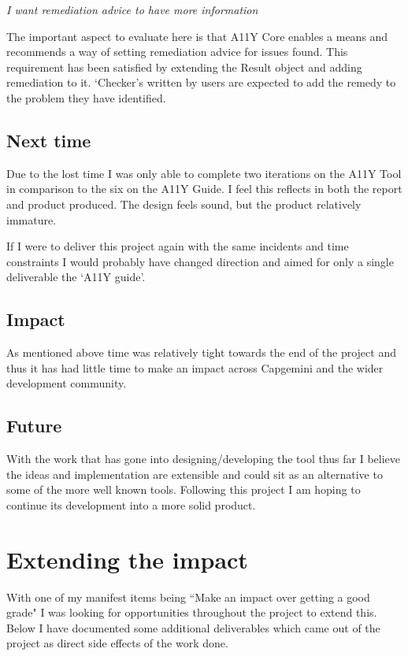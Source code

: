\begin{center}
\textit{I want remediation advice to have more information}
\end{center}
The important aspect to evaluate here is that A11Y Core enables a means and
recommends a way of setting remediation advice for issues found. This
requirement has been satisfied by extending the Result object and adding
remediation to it. `Checker's written by users are expected to add the remedy
to the problem they have identified.

\subsection{Next time}
Due to the lost time I was only able to complete two iterations on the A11Y
Tool in comparison to the six on the A11Y Guide. I feel this reflects in both
the report and product produced. The design feels sound, but the product
relatively immature.

If I were to deliver this project again with the same incidents and time
constraints I would probably have changed direction and aimed for only a
single deliverable the `A11Y guide'.

\subsection{Impact}
As mentioned above time was relatively tight towards the end of the project
and thus it has had little time to make an impact across Capgemini and the
wider development community.

\subsection{Future}
With the work that has gone into designing/developing the tool thus far I
believe the ideas and implementation are extensible and could sit as an
alternative to some of the more well known tools. Following this project I am
hoping to continue its development into a more solid product.


\section{Extending the impact}
With one of my manifest items being ``Make an impact over getting a good
grade" I was looking for opportunities throughout the project to extend this.
Below I have documented some additional deliverables which came out of the
project as direct side effects of the work done.

